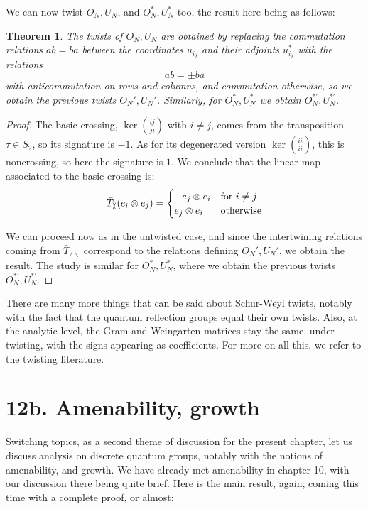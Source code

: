 \documentclass[12pt]{amsbook}
\newtheorem{theorem}{Theorem}[chapter]
\begin{document}
We can now twist $O_N,U_N$, and $O_N^*,U_N^*$ too, the result here being as follows:


\begin{theorem}
The twists of $O_N,U_N$ are obtained by replacing the commutation relations $ab=ba$ between the coordinates $u_{ij}$ and their adjoints $u_{ij}^*$ with the relations
$$ab=\pm ba$$
with anticommutation on rows and columns, and commutation otherwise, so we obtain the previous twists $O_N',U_N'$. Similarly, for $O_N^*,U_N^*$ we obtain $O_N^{*\prime},U_N^{*\prime}$.
\end{theorem}

\begin{proof}
The basic crossing, $\ker\binom{ij}{ji}$ with $i\neq j$, comes from the transposition $\tau\in S_2$, so its signature is $-1$. As for its degenerated version $\ker\binom{ii}{ii}$, this is noncrossing, so here the signature is $1$. We conclude that the linear map associated to the basic crossing is:
$$\bar{T}_{\slash\!\!\!\backslash}(e_i\otimes e_j)
=\begin{cases}
-e_j\otimes e_i&{\rm for}\ i\neq j\\
e_j\otimes e_i&{\rm otherwise}
\end{cases}$$

We can proceed now as in the untwisted case, and since the intertwining relations coming from $\bar{T}_{\slash\!\!\!\backslash}$ correspond to the relations defining $O_N',U_N'$, we obtain the result. The study is similar for $O_N^*,U_N^*$, where we obtain the previous twists $O_N^{*\prime},U_N^{*\prime}$.
\end{proof}

There are many more things that can be said about Schur-Weyl twists, notably with the fact that the quantum reflection groups equal their own twists. Also, at the analytic level, the Gram and Weingarten matrices stay the same, under twisting, with the signs appearing as coefficients. For more on all this, we refer to the twisting literature.

\section*{12b. Amenability, growth}

Switching topics, as a second theme of discussion for the present chapter, let us discuss analysis on discrete quantum groups, notably with the notions of amenability, and growth. We have already met amenability in chapter 10, with our discussion there being quite brief. Here is the main result, again, coming this time with a complete proof, or almost:
\end{document}
